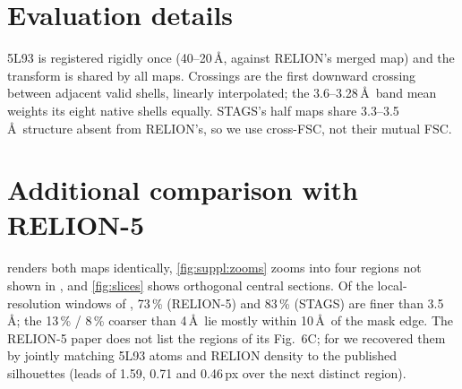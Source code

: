 \clearpage
\setcounter{page}{1}
\maketitlesupplementary

\setcounter{section}{0}
\setcounter{table}{0}
\setcounter{figure}{0}
\setcounter{equation}{0}
\renewcommand{\thesection}{S\arabic{section}}
\renewcommand{\thetable}{S\arabic{table}}
\renewcommand{\thefigure}{S\arabic{figure}}
\renewcommand{\theequation}{S\arabic{equation}}
\renewcommand{\theHsection}{S\arabic{section}}
\renewcommand{\theHtable}{S\arabic{table}}
\renewcommand{\theHfigure}{S\arabic{figure}}
\renewcommand{\theHequation}{S\arabic{equation}}
\setcounter{topnumber}{4}\setcounter{bottomnumber}{3}\setcounter{totalnumber}{6}
\renewcommand{\topfraction}{0.95}\renewcommand{\bottomfraction}{0.6}\renewcommand{\textfraction}{0.05}\renewcommand{\floatpagefraction}{0.85}



\section{Evaluation details}
\label{sec:suppl:eval}

5L93 is registered rigidly once (40--20\,\AA, against RELION's merged map) and the transform is shared by all maps.
Crossings are the first downward crossing between adjacent valid shells, linearly interpolated; the 3.6--3.28\,\AA\ band mean weights its eight native shells equally.
STAGS's half maps share 3.3--3.5\,\AA\ structure absent from RELION's, so we use cross-FSC, not their mutual FSC.

\section{Additional comparison with RELION-5}
\label{sec:suppl:visual}

 renders both maps identically, \cref{fig:suppl:zooms} zooms into four regions not shown in , and \cref{fig:slices} shows orthogonal central sections.
Of the local-resolution windows of , 73\,\% (RELION-5) and 83\,\% (STAGS) are finer than 3.5\,\AA; the 13\,\% / 8\,\% coarser than 4\,\AA\ lie mostly within 10\,\AA\ of the mask edge.
The RELION-5 paper does not list the regions of its Fig.~6C; for  we recovered them by jointly matching 5L93 atoms and RELION density to the published silhouettes (leads of 1.59, 0.71 and 0.46\,px over the next distinct region).

